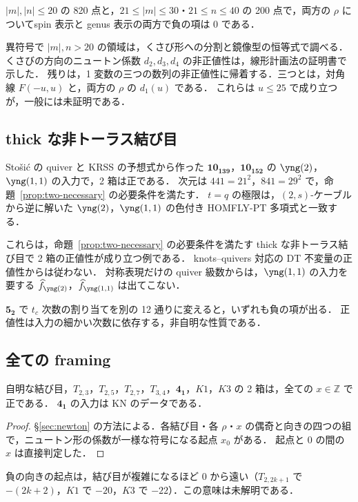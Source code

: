\begin{compresult}
$|m|,|n|\le20$ の 820 点と，$21\le|m|\le30$・$21\le n\le40$ の 200 点で，両方の $\rho$ についてspin 表示と genus 表示の両方で負の項は 0 である．
\end{compresult}

異符号で $|m|,n>20$ の領域は，くさび形への分割と鏡像型の恒等式で調べる．
くさびの方向のニュートン係数 $d_2,d_3,d_4$ の非正値性は，線形計画法の証明書で示した．
残りは，1 変数の三つの数列の非正値性に帰着する．三つとは，対角線 $F(-u,u)$ と，両方の $\rho$ の $d_1(u)$ である．
これらは $u\le25$ で成り立つが，一般には未証明である．

\subsection{thick な非トーラス結び目}
\begin{compresult}\label{cr:thick}
Stošić の quiver と KRSS の予想式から作った $\mathbf{10_{139}}$，$\mathbf{10_{152}}$ の $\yng(2)$，$\yng(1,1)$ の入力で，2 箱は正である．
次元は $441=21^2$，$841=29^2$ で，命題~\ref{prop:two-necessary} の必要条件を満たす．
$t=q$ の極限は，$(2,s)$-ケーブルから逆に解いた $\yng(2)$，$\yng(1,1)$ の色付き HOMFLY-PT 多項式と一致する．
\end{compresult}
これらは，命題~\ref{prop:two-necessary} の必要条件を満たす thick な非トーラス結び目で 2 箱の正値性が成り立つ例である．
knots--quivers 対応の DT 不変量の正値性からは従わない．
対称表現だけの quiver 級数からは，$\yng(1,1)$ の入力を要する $\hf_{\yng(2)}$，$\hf_{\yng(1,1)}$ は出てこない．

\begin{remark}[正値性は自動的ではない]
$\mathbf{5_2}$ で $t_c$ 次数の割り当てを別の 12 通りに変えると，いずれも負の項が出る．
正値性は入力の細かい次数に依存する，非自明な性質である．
\end{remark}

\subsection{全ての framing}
\begin{theorem}[計算機援用]\label{thm:two-all-x}
自明な結び目，$T_{2,3}$，$T_{2,5}$，$T_{2,7}$，$T_{3,4}$，$\mathbf{4_1}$，$K1$，$K3$ の 2 箱は，全ての $x\in\mathbb{Z}$ で正である．
$\mathbf{4_1}$ の入力は KN のデータである．
\end{theorem}
\begin{proof}
\S\ref{sec:newton} の方法による．各結び目・各 $\rho$・$x$ の偶奇と向きの四つの組で，ニュートン形の係数が一様な符号になる起点 $x_0$ がある．
起点と 0 の間の $x$ は直接判定した．
\end{proof}
負の向きの起点は，結び目が複雑になるほど 0 から遠い（$T_{2,2k+1}$ で $-(2k+2)$，$K1$ で $-20$，$K3$ で $-22$）．この意味は未解明である．

